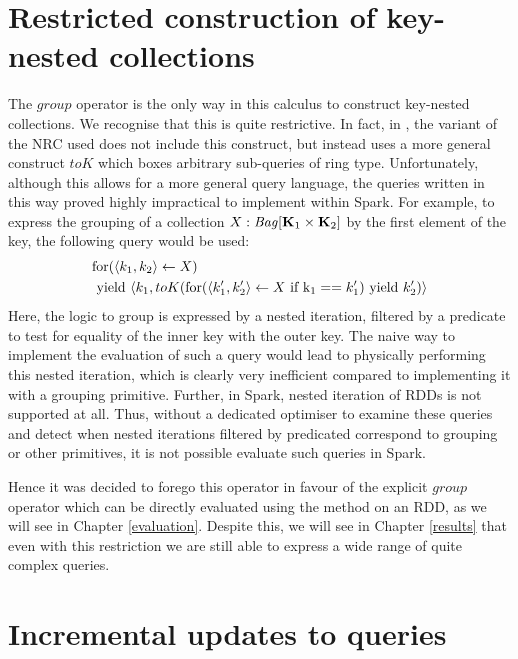 {{{\section{Restricted construction of key-nested collections}
The $group$ operator is the only way in this calculus to construct key-nested collections. We recognise that this is quite restrictive. In fact, in \cite{draftpaper}, the variant of the NRC used does not include this construct, but instead uses a more general construct $toK$ which boxes arbitrary sub-queries of ring type. Unfortunately, although this allows for a more general query language, the queries written in this way proved highly impractical to implement within Spark. For example, to express the grouping of a collection $X: \textrm{\textit{Bag}}[\mathbf{K}_1 \times \mathbf{K}_2]$ by the first element of the key, the following query would be used:
\begin{equation*}
\begin{split}
&\textrm{for}(\langle k_1, k_2 \rangle \leftarrow X) \\
&\textrm{ yield } \langle k_1, toK(\textrm{for}(\langle k_1', k_2' \rangle \leftarrow X \textrm{ if k}_1 == k_1') \textrm{ yield } k_2') \rangle
\end{split}
\end{equation*}
Here, the logic to group is expressed by a nested iteration, filtered by a predicate to test for equality of the inner key with the outer key.
The naive way to implement the evaluation of such a query would lead to physically performing this nested iteration, which is clearly very inefficient compared to implementing it with a grouping primitive. Further, in Spark, nested iteration of RDDs is not supported at all.
Thus, without a dedicated optimiser to examine these queries and detect when nested iterations filtered by predicated correspond to grouping or other primitives, it is not possible evaluate such queries in Spark.

Hence it was decided to forego this operator in favour of the explicit $group$ operator which can be directly evaluated using the  method on an RDD, as we will see in Chapter \ref{evaluation}.
Despite this, we will see in Chapter \ref{results} that even with this restriction we are still able to express a wide range of quite complex queries. 

}

\section{Incremental updates to queries} { \label{deltas}



}}}

